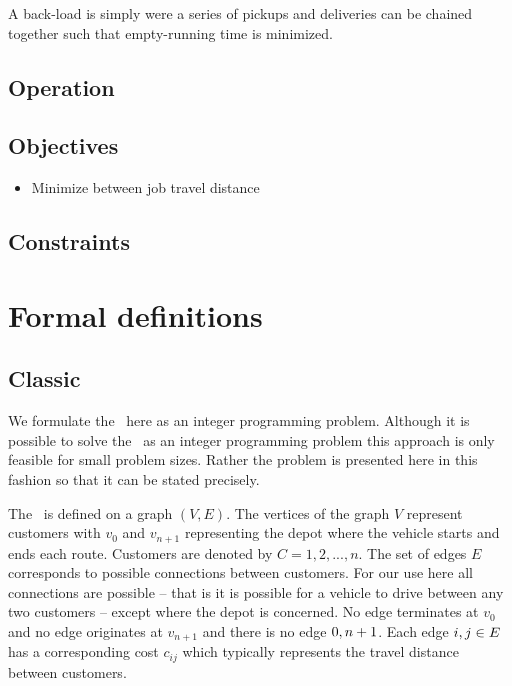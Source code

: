 A back-load is simply were a series of pickups and deliveries can be chained together such that empty-running time is minimized.

\subsection{Operation}


\subsection{Objectives}

\begin{itemize}
	\item Minimize between job travel distance
\end{itemize}

\subsection{Constraints}


\section{Formal definitions}


\subsection{Classic \VRP}
We formulate the \VRP\ here as an integer programming problem. Although it is possible to solve the \VRP\ as an integer programming problem this approach is only feasible for small problem sizes. Rather the problem is presented here in this fashion so that it can be stated precisely.
 
The \VRP\ is defined on a graph $(V,E)$. The vertices of the graph $V$ represent customers with $v_0$ and $v_{n+1}$ representing the depot where the vehicle starts and ends each route. Customers are denoted by $C = 1,2,...,n$. The set of edges $E$ corresponds to possible connections between customers. For our use here all connections are possible -- that is it is possible for a vehicle to drive between any two customers -- except where the depot is concerned. No edge terminates at $v_0$ and no edge originates at $v_{n+1}$ and there is no edge $\edge{0,n+1}$. Each edge $i,j\in E$ has a corresponding cost $c_{ij}$ which typically represents the travel distance between customers.

